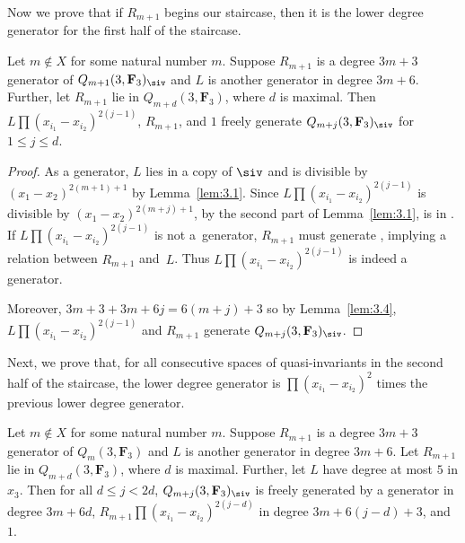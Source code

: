 Now we prove that if $R_{m+1}$ begins our staircase, then it is the lower degree generator for the first half of the staircase.

\begin{Lemma}\label{higerGen}
 Let $m\not\in X$ for some natural number $m$. Suppose $R_{m+1}$ is a degree $3m+3$ generator of $Q_{m+1}(3,\mathbf{F}_3)_{\siv}$ and $L$ is another generator in degree $3m+6$. Further, let $R_{m+1}$ lie in $Q_{m+d}(3,\mathbf{F}_3)$, where $d$ is maximal. Then $L\prod(x_{i_1}-x_{i_2})^{2(j-1)}$, $R_{m+1}$, and $1$ freely generate $Q_{m+j}(3,\mathbf{F}_3)_{\siv}$ for $1\leq j \leq d$.
\end{Lemma}
\begin{proof}
 As a generator, $L$ lies in a copy of $\siv$ and is divisible by $(x_1-x_2)^{2(m+1)+1}$ by Lemma~\ref{lem:3.1}. Since $L\prod(x_{i_1}-x_{i_2})^{2(j-1)}$ is divisible by $(x_1-x_2)^{2(m+j)+1}$, by the second part of Lemma~\ref{lem:3.1},  is in . If $L\prod(x_{i_1}-x_{i_2})^{2(j-1)}$ is not a~generator, $R_{m+1}$ must generate , implying a relation between $R_{m+1}$ and~$L$. Thus $L\prod(x_{i_1}-x_{i_2})^{2(j-1)}$ is indeed a generator.

 Moreover, $3m+3+3m+6j=6(m+j)+3$ so by Lemma~\ref{lem:3.4}, $L\prod(x_{i_1}-x_{i_2})^{2(j-1)}$ and $R_{m+1}$ generate $Q_{m+j}(3,\mathbf{F}_3)_{\siv}$.
\end{proof}

Next, we prove that, for all consecutive spaces of quasi-invariants in the second half of the staircase, the lower degree generator is $\prod (x_{i_1}-x_{i_2})^{2}$ times the previous lower degree generator.

\begin{Lemma}\label{lowerGen}
 Let $m\not\in X$ for some natural number $m$. Suppose $R_{m+1}$ is a degree $3m+3$ generator of $Q_m(3,\mathbf{F}_3)$ and $L$ is another generator in degree $3m+6$. Let $R_{m+1}$ lie in $Q_{m+d}(3,\mathbf{F}_3)$, where $d$ is maximal. Further, let $L$ have degree at most $5$ in $x_3$. Then for all $d\leq j< 2d$, $Q_{m+j}(3,\mathbf{F}_3)_{\siv}$ is freely generated by a generator in degree $3m+6d$, $R_{m+1}\prod(x_{i_1}-x_{i_2})^{2(j-d)}$ in degree $3m+6(j-d)+3$, and $1$.
\end{Lemma}

